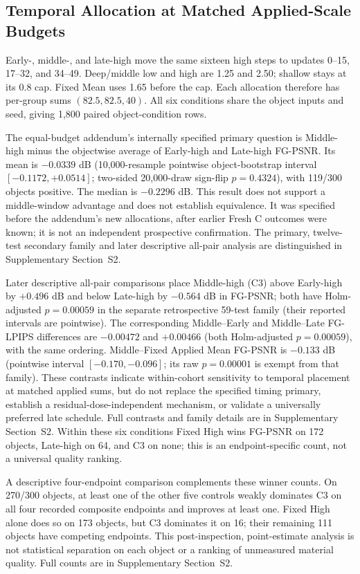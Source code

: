 \documentclass[times,twocolumn,final]{elsarticle}
\begin{document}
\subsection{Temporal Allocation at Matched Applied-Scale Budgets}
\label{subsec:matched-budget300}
Early-, middle-, and late-high move the same sixteen high steps to updates 0--15, 17--32, and 34--49. Deep/middle low and high are 1.25 and 2.50; shallow stays at its 0.8 cap. Fixed Mean uses 1.65 before the cap. Each allocation therefore has per-group sums $(82.5,82.5,40)$. All six conditions share the object inputs and seed, giving 1,800 paired object-condition rows.

The equal-budget addendum's internally specified primary question is Middle-high minus the objectwise average of Early-high and Late-high FG-PSNR. Its mean is $-0.0339$ dB (10,000-resample pointwise object-bootstrap interval $[-0.1172,+0.0514]$; two-sided 20,000-draw sign-flip $p=0.4324$), with 119/300 objects positive. The median is $-0.2296$ dB. This result does not support a middle-window advantage and does not establish equivalence. It was specified before the addendum's new allocations, after earlier Fresh C outcomes were known; it is not an independent prospective confirmation. The primary, twelve-test secondary family and later descriptive all-pair analysis are distinguished in Supplementary Section~S2.

Later descriptive all-pair comparisons place Middle-high (C3) above Early-high by $+0.496$ dB and below Late-high by $-0.564$ dB in FG-PSNR; both have Holm-adjusted $p=0.00059$ in the separate retrospective 59-test family (their reported intervals are pointwise). The corresponding Middle--Early and Middle--Late FG-LPIPS differences are $-0.00472$ and $+0.00466$ (both Holm-adjusted $p=0.00059$), with the same ordering. Middle--Fixed Applied Mean FG-PSNR is $-0.133$ dB (pointwise interval $[-0.170,-0.096]$; its raw $p=0.00001$ is exempt from that family). These contrasts indicate within-cohort sensitivity to temporal placement at matched applied sums, but do not replace the specified timing primary, establish a residual-dose-independent mechanism, or validate a universally preferred late schedule. Full contrasts and family details are in Supplementary Section~S2. Within these six conditions Fixed High wins FG-PSNR on 172 objects, Late-high on 64, and C3 on none; this is an endpoint-specific count, not a universal quality ranking.

A descriptive four-endpoint comparison complements these winner counts. On 270/300 objects, at least one of the other five controls weakly dominates C3 on all four recorded composite endpoints and improves at least one. Fixed High alone does so on 173 objects, but C3 dominates it on 16; their remaining 111 objects have competing endpoints. This post-inspection, point-estimate analysis is not statistical separation on each object or a ranking of unmeasured material quality. Full counts are in Supplementary Section~S2.
\end{document}

